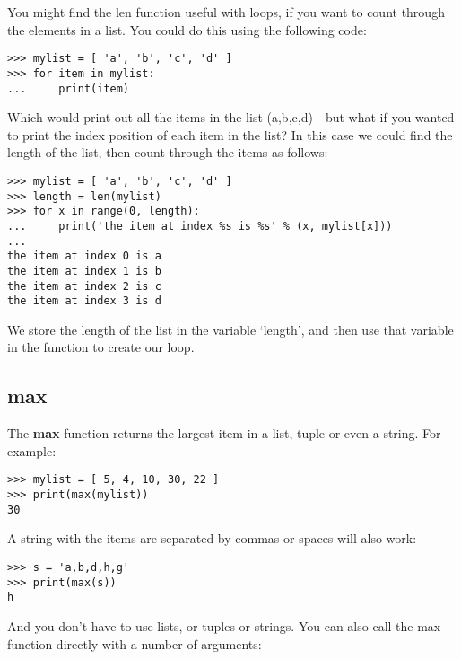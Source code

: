 \noindent
You might find the len function useful with loops, if you want to count through the elements in a list.  You could do this using the following code:

\begin{Verbatim}[frame=single]
>>> mylist = [ 'a', 'b', 'c', 'd' ]
>>> for item in mylist:
...     print(item)
\end{Verbatim}

\noindent
Which would print out all the items in the list (a,b,c,d)---but what if you wanted to print the index position of each item in the list?  In this case we could find the length of the list, then count through the items as follows:

\begin{Verbatim}[frame=single]
>>> mylist = [ 'a', 'b', 'c', 'd' ]
>>> length = len(mylist)
>>> for x in range(0, length):
...     print('the item at index %s is %s' % (x, mylist[x]))
...
the item at index 0 is a
the item at index 1 is b
the item at index 2 is c
the item at index 3 is d
\end{Verbatim}

\noindent
We store the length of the list in the variable `length', and then use that variable in the  function to create our loop.

\subsection*{max}

The \textbf{max} function returns the largest item in a list, tuple or even a string. For example:

\begin{Verbatim}[frame=single]
>>> mylist = [ 5, 4, 10, 30, 22 ]
>>> print(max(mylist))
30
\end{Verbatim}

\noindent
A string with the items are separated by commas or spaces will also work:

\begin{Verbatim}[frame=single]
>>> s = 'a,b,d,h,g'
>>> print(max(s))
h
\end{Verbatim}

\noindent
And you don't have to use lists, or tuples or strings. You can also call the max function directly with a number of arguments:


